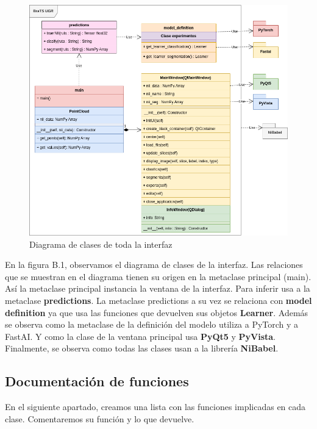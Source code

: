 \begin{figure}[H]
	\centering
	\includegraphics[width=1.0\linewidth]{imagenes/diagrama_interfaz.png}
	\caption{Diagrama de clases de toda la interfaz}
\end{figure}

En la figura B.1, observamos el diagrama de clases de la interfaz. Las relaciones que se muestran en el diagrama tienen su origen en la metaclase principal (main). Así la metaclase principal instancia la ventana de la interfaz. Para inferir usa a la metaclase \textbf{predictions}. La metaclase predictions a su vez se relaciona con \textbf{model definition} ya que usa las funciones que devuelven sus objetos \textbf{Learner}. Además se observa como la metaclase de la definición del modelo utiliza a PyTorch y a FastAI. Y como la clase de la ventana principal usa \textbf{PyQt5} y \textbf{PyVista}. Finalmente, se observa como todas las clases usan a la librería \textbf{NiBabel}.


\subsection{Documentación de funciones}

En el siguiente apartado, creamos una lista con las funciones implicadas en cada clase. Comentaremos su función y lo que devuelve.


